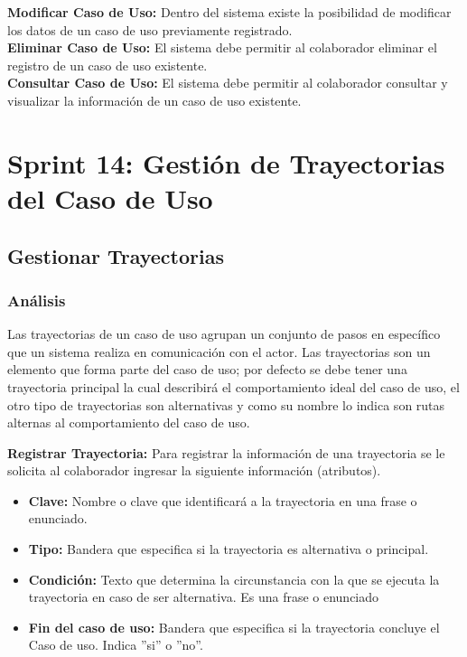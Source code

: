 \textbf {Modificar Caso de Uso:}
Dentro del sistema existe la posibilidad de modificar los datos de un caso de uso previamente registrado.\\

\textbf {Eliminar Caso de Uso:} 
El sistema debe permitir al colaborador eliminar el registro de un caso de uso existente.\\

\textbf {Consultar Caso de Uso:} 
El sistema debe permitir al colaborador consultar y visualizar la información de un caso de uso existente.\\

\section{Sprint 14: Gestión de Trayectorias del Caso de Uso}

\subsection{Gestionar Trayectorias}
\subsubsection {Análisis}

Las trayectorias de un caso de uso agrupan un conjunto de pasos en específico que un sistema realiza en comunicación con el actor. Las trayectorias son un elemento que forma parte del caso de uso; por defecto se debe tener una trayectoria principal la cual describirá el comportamiento ideal del caso de uso, el otro tipo de trayectorias son alternativas y como su nombre lo indica son rutas alternas al comportamiento del caso de uso.

\textbf {Registrar Trayectoria:}
Para registrar la información de una trayectoria se le solicita al colaborador ingresar la siguiente información (atributos).
\begin{itemize}
	
	\item \textbf{Clave:} Nombre o clave que identificará a la trayectoria en una frase o enunciado.
	\item \textbf{Tipo:} Bandera que especifica si la trayectoria es alternativa o principal.
	\item \textbf{Condición:} Texto que determina la circunstancia con la que se ejecuta la trayectoria en caso de ser alternativa. Es una frase o enunciado
	\item \textbf{Fin del caso de uso:} Bandera que especifica si la trayectoria concluye el Caso de uso. Indica ”si” o ”no”.
	
\end{itemize}

